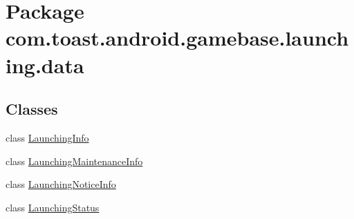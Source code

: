 \hypertarget{namespacecom_1_1toast_1_1android_1_1gamebase_1_1launching_1_1data}{}\section{Package com.\+toast.\+android.\+gamebase.\+launching.\+data}
\label{namespacecom_1_1toast_1_1android_1_1gamebase_1_1launching_1_1data}
\subsection*{Classes}
\begin{DoxyCompactItemize}
\item 
class \hyperlink{classcom_1_1toast_1_1android_1_1gamebase_1_1launching_1_1data_1_1_launching_info}{Launching\+Info}
\item 
class \hyperlink{classcom_1_1toast_1_1android_1_1gamebase_1_1launching_1_1data_1_1_launching_maintenance_info}{Launching\+Maintenance\+Info}
\item 
class \hyperlink{classcom_1_1toast_1_1android_1_1gamebase_1_1launching_1_1data_1_1_launching_notice_info}{Launching\+Notice\+Info}
\item 
class \hyperlink{classcom_1_1toast_1_1android_1_1gamebase_1_1launching_1_1data_1_1_launching_status}{Launching\+Status}
\end{DoxyCompactItemize}
